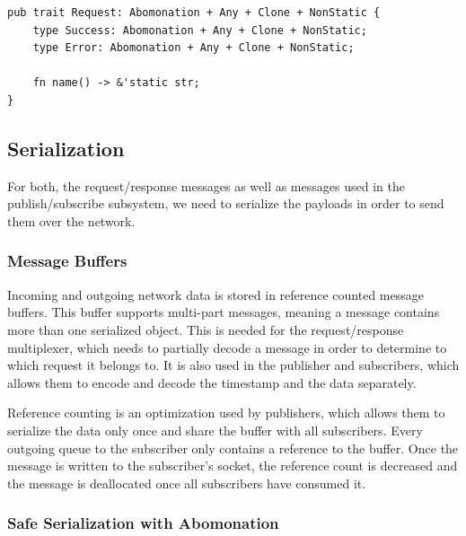 \begin{lstlisting}[caption={[Request trait]In order for a type to be used as a
request message, it needs to implement the \lstinline{Request} trait. The name allows
request handlers to differentiate between different types of requests, while the associated
types forces them to issue well-formed responses.
The trait bounds are explained in section \ref{sec:serialization}.}]
pub trait Request: Abomonation + Any + Clone + NonStatic {
    type Success: Abomonation + Any + Clone + NonStatic;
    type Error: Abomonation + Any + Clone + NonStatic;

    fn name() -> &'static str;
}
\end{lstlisting}

\subsection{Serialization} \label{sec:serialization}

For both, the request/response messages as well as messages used in the publish/subscribe
subsystem, we need to serialize the payloads in order to send them over the network.

\subsubsection{Message Buffers}

Incoming and outgoing network data is stored in reference counted message buffers.
This buffer supports multi-part messages, meaning a message contains more than
one serialized object. This is needed for the request/response multiplexer, which
needs to partially decode a message in order to determine to which request it
belongs to. It is also used in the publisher and subscribers, which allows them
to encode and decode the timestamp and the data separately.

Reference counting is an optimization used by publishers, which allows them to
serialize the data only once and share the buffer with all subscribers. Every
outgoing queue to the subscriber only contains a reference to the buffer. Once
the message is written to the subscriber's socket, the reference count is
decreased and the message is deallocated once all subscribers have consumed it.

\subsubsection{Safe Serialization with Abomonation}

